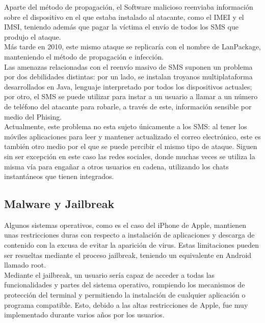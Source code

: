 \documentclass[11pt]{article}
\begin{document}
{Aparte del método de propagación, el Software malicioso reenviaba información sobre el dispositivo en el que estaba instalado al atacante, como el IMEI y el IMSI, teniendo además que pagar la víctima el envío de todos los SMS que produjo el ataque.} \\

{Más tarde en 2010, este mismo ataque se replicaría con el nombre de LanPackage, manteniendo el método de propagación e infección.} \\

{Las amenazas relacionadas con el reenvío masivo de SMS suponen un problema por dos debilidades distintas: por un lado, se instalan troyanos multiplataforma desarrollados en Java, lenguaje interpretado por todos los dispositivos actuales; por otro, el SMS se puede utilizar para instar a un usuario a llamar a un número de teléfono del atacante para robarle, a través de este, información sensible por medio del Phising.} \\

{Actualmente, este problema no esta sujeto únicamente a los SMS: al tener los móviles aplicaciones para leer y mantener actualizado el correo electrónico, este es también otro medio por el que se puede percibir el mismo tipo de ataque. Siguen sin ser excepción en este caso las redes sociales, donde muchas veces se utiliza la misma vía para engañar a otros usuarios en cadena, utilizando los chats instantáneos que tienen integrados.}

\subsection{Malware y Jailbreak}

{Algunos sistemas operativos, como es el caso del iPhone de Apple, mantienen unas restricciones duras con respecto a instalación de aplicaciones y descarga de contenido con la excusa de evitar la aparición de virus. Estas limitaciones pueden ser resueltas mediante el proceso jailbreak, teniendo un equivalente en Android llamado root.} \\

{Mediante el jailbreak, un usuario sería capaz de acceder a todas las funcionalidades y partes del sistema operativo, rompiendo los mecanismos de protección del terminal y permitiendo la instalación de cualquier aplicación o programa compatible. Esto, debido a las altas restricciones de Apple, fue muy implementado durante varios años por los usuarios.} \\
\end{document}
